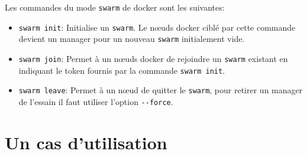 Les commandes du mode \verb:swarm: de docker sont les suivantes:
\begin{itemize}
	\item \verb:swarm init:: Initialise un \verb:swarm:. Le nœuds docker ciblé par 
        cette commande devient un manager pour un nouveau \verb:swarm: initialement vide.
	\item \verb:swarm join:: Permet à un nœuds docker de rejoindre un \verb:swarm: existant
        en indiquant le token fournis par la commande \verb:swarm init:.
    \item \verb:swarm leave:: Permet à un nœud de quitter le \verb:swarm:, pour retirer un 
        manager de l'essain il faut utiliser l'option \verb:--force:.
\end{itemize}

\section{Un cas d'utilisation}

